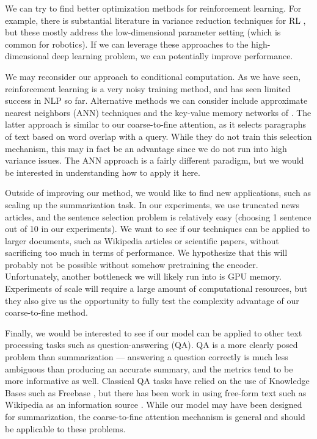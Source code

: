 \documentclass[12pt]{report}
\begin{document}
We can try to find better optimization methods for reinforcement learning. For example, there is substantial literature in variance reduction techniques for RL \citep[e.g.][]{Schulman2015TRPO}, but these mostly address the low-dimensional parameter setting (which is common for robotics). If we can leverage these approaches to the high-dimensional deep learning problem, we can potentially improve performance.

We may reconsider our approach to conditional computation. As we have seen, reinforcement learning is a very noisy training method, and has seen limited success in NLP so far.
Alternative methods we can consider include approximate nearest neighbors (ANN) techniques \citep{rae2016sparsememory} and the key-value memory networks of \citet{Miller2016}.
The latter approach is similar to our coarse-to-fine attention, as it selects paragraphs of text based on word overlap with a query. While they do not train this selection mechanism, this may in fact be an advantage since we do not run into high variance issues.
The ANN approach is a fairly different paradigm, but we would be interested in understanding how to apply it here.

Outside of improving our method, we would like to find new applications, such as scaling up the summarization task. In our experiments, we use truncated news articles, and the sentence selection problem is relatively easy (choosing 1 sentence out of 10 in our experiments). 
We want to see if our techniques can be applied to larger documents, such as Wikipedia articles or scientific papers, without sacrificing too much in terms of performance. We hypothesize that this will probably not be possible without somehow pretraining the encoder.
Unfortunately, another bottleneck we will likely run into is GPU memory. Experiments of scale will require a large amount of computational resources, but they also give us the opportunity to fully test the complexity advantage of our coarse-to-fine method.

Finally, we would be interested to see if our model can be applied to other text processing tasks such as question-answering (QA). QA is a more clearly posed problem than summarization --- answering a question correctly is much less ambiguous than producing an accurate summary, and the metrics tend to be more informative as well.
Classical QA tasks have relied on the use of Knowledge Bases such as Freebase \citep{Bollacker2008}, but there has been work in using free-form text such as Wikipedia as an information source \citep{Miller2016}. While our model may have been designed for summarization, the coarse-to-fine attention mechanism is general and should be applicable to these problems.
\end{document}
